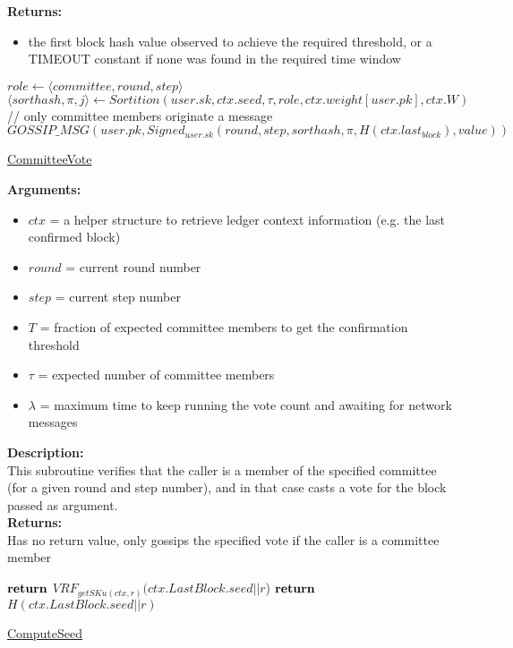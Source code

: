 \documentclass[10pt,a4paper]{article}
\begin{document}
\noindent \textbf{Returns:}
\begin{itemize}
    \item the first block hash value observed to achieve the required threshold, or a TIMEOUT constant if none was found in the
    required time window
  \end{itemize}

\begin{algorithm}
    \begin{algorithmic}[H]
    \State $role \gets \langle {committee},round,step\rangle$
    \State $\langle sorthash,\pi,j\rangle \gets Sortition(user.sk,ctx.seed,\tau ,role,ctx.weight[user.pk],ctx.W)$
    // only committee members originate a message
        \State $GOSSIP\_MSG(user.pk, Signed_{user.sk} (round,step,sorthash,\pi,H(ctx.last_{block}),value))$
    \EndIf
    \EndFunction
    \end{algorithmic}
    \caption{\underline{CommitteeVote}}
\end{algorithm}

\noindent \textbf{Arguments:}
\begin{itemize}
    \item $ctx$ = a helper structure to retrieve ledger context information (e.g. the last confirmed block)
    \item $round$ = current round number
    \item $step$ = current step number
    \item $T$ = fraction of expected committee members to get the confirmation threshold
    \item $\tau$ = expected number of committee members
    \item $\lambda$ = maximum time to keep running the vote count and awaiting for network messages
  \end{itemize}

\noindent \textbf{Description:}\\
This subroutine verifies that the caller is a member of the specified committee (for a given round and step number), 
and in that case casts a vote for the block passed as argument.\\

\noindent \textbf{Returns:}\\
Has no return value, only gossips the specified vote if the caller is a committee member


\begin{algorithm}
    \begin{algorithmic}[H]
            \State $\Return$ $VRF_{getSKu(ctx, r)}(ctx.LastBlock.seed||r$)
        \Else
            \State $\Return$ $H(ctx.LastBlock.seed||r)$
        \EndIf
    \EndFunction
    \end{algorithmic}
    \caption{\underline{ComputeSeed}}
\end{algorithm}
\end{document}
